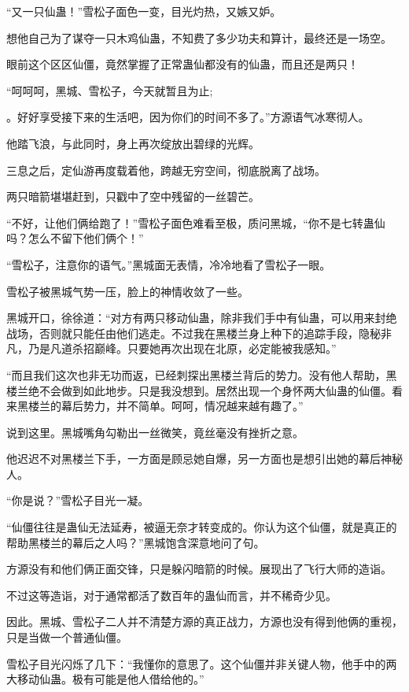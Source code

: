 
\begin{this_body}

“又一只仙蛊！”雪松子面色一变，目光灼热，又嫉又妒。

想他自己为了谋夺一只木鸡仙蛊，不知费了多少功夫和算计，最终还是一场空。

眼前这个区区仙僵，竟然掌握了正常蛊仙都没有的仙蛊，而且还是两只！

“呵呵呵，黑城、雪松子，今天就暂且为止;

。好好享受接下来的生活吧，因为你们的时间不多了。”方源语气冰寒彻人。

他踏飞浪，与此同时，身上再次绽放出碧绿的光辉。

三息之后，定仙游再度载着他，跨越无穷空间，彻底脱离了战场。

两只暗箭堪堪赶到，只戳中了空中残留的一丝碧芒。

“不好，让他们俩给跑了！”雪松子面色难看至极，质问黑城，“你不是七转蛊仙吗？怎么不留下他们俩个！”

“雪松子，注意你的语气。”黑城面无表情，冷冷地看了雪松子一眼。

雪松子被黑城气势一压，脸上的神情收敛了一些。

黑城开口，徐徐道：“对方有两只移动仙蛊，除非我们手中有仙蛊，可以用来封绝战场，否则就只能任由他们逃走。不过我在黑楼兰身上种下的追踪手段，隐秘非凡，乃是凡道杀招巅峰。只要她再次出现在北原，必定能被我感知。”

“而且我们这次也非无功而返，已经刺探出黑楼兰背后的势力。没有他人帮助，黑楼兰绝不会做到如此地步。只是我没想到。居然出现一个身怀两大仙蛊的仙僵。看来黑楼兰的幕后势力，并不简单。呵呵，情况越来越有趣了。”

说到这里。黑城嘴角勾勒出一丝微笑，竟丝毫没有挫折之意。

他迟迟不对黑楼兰下手，一方面是顾忌她自爆，另一方面也是想引出她的幕后神秘人。

“你是说？”雪松子目光一凝。

“仙僵往往是蛊仙无法延寿，被逼无奈才转变成的。你认为这个仙僵，就是真正的帮助黑楼兰的幕后之人吗？”黑城饱含深意地问了句。

方源没有和他们俩正面交锋，只是躲闪暗箭的时候。展现出了飞行大师的造诣。

不过这等造诣，对于通常都活了数百年的蛊仙而言，并不稀奇少见。

因此。黑城、雪松子二人并不清楚方源的真正战力，方源也没有得到他俩的重视，只是当做一个普通仙僵。

雪松子目光闪烁了几下：“我懂你的意思了。这个仙僵并非关键人物，他手中的两大移动仙蛊。极有可能是他人借给他的。”


\end{this_body}
